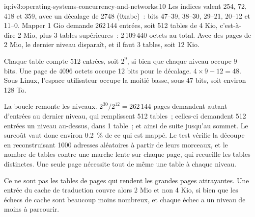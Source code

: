 \begin{solution}{iq:iv3:operating-systems-concurrency-and-networks:10}
Les indices valent 254, 72, 418 et 359, avec un décalage de 2748 (0xabc)~: bits 47--39, 38--30, 29--21, 20--12 et 11--0. Mapper 1 Gio demande 262\,144 entrées, soit 512 tables de 4 Kio, c'est-à-dire 2 Mio, plus 3 tables supérieures~: 2\,109\,440 octets au total. Avec des pages de 2 Mio, le dernier niveau disparaît, et il faut 3 tables, soit 12 Kio.
\label{lst:iv3:os:pagewalk}

Chaque table compte 512 entrées, soit $2^9$, si bien que chaque niveau occupe 9 bits. Une page de 4096 octets occupe 12 bits pour le décalage. $4 \times 9 + 12 = 48$. Sous Linux, l'espace utilisateur occupe la moitié basse, sous 47 bits, soit environ 128 To.

La boucle remonte les niveaux. $2^{30} / 2^{12} = 262\,144$ pages demandent autant d'entrées au dernier niveau, qui remplissent 512 tables~; celles-ci demandent 512 entrées un niveau au-dessus, dans 1 table~; et ainsi de suite jusqu'au sommet. Le surcoût vaut donc environ 0.2~\% de ce qui est mappé. Le test vérifie la découpe en reconstruisant 1000 adresses aléatoires à partir de leurs morceaux, et le nombre de tables contre une marche lente sur chaque page, qui recueille les tables distinctes. Une seule page nécessite tout de même une table à chaque niveau.

Ce ne sont pas les tables de pages qui rendent les grandes pages attrayantes. Une entrée du cache de traduction couvre alors 2 Mio et non 4 Kio, si bien que les échecs de cache sont beaucoup moins nombreux, et chaque échec a un niveau de moins à parcourir.

\end{solution}


